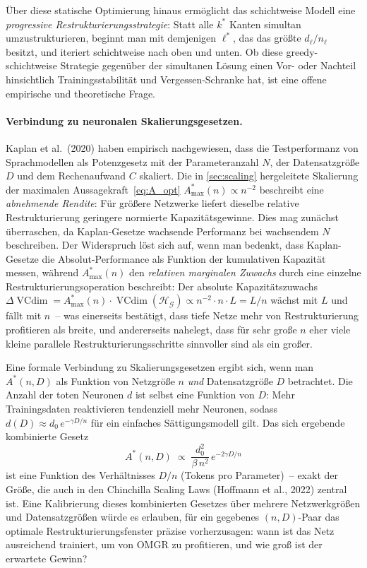 ﻿\documentclass[12pt, a4paper, openany]{report}
\newcommand{\calG}{\mathcal{G}}
\newcommand{\calH}{\mathcal{H}}
\DeclareMathOperator{\VC}{VCdim}
\begin{document}
Über diese statische Optimierung hinaus ermöglicht das schichtweise Modell
eine \emph{progressive Restrukturierungsstrategie}: Statt alle $k^*$ Kanten
simultan umzustrukturieren, beginnt man mit demjenigen $\ell^*$, das das
größte $d_{\ell} / n_{\ell}$ besitzt, und iteriert schichtweise nach oben
und unten.  Ob diese greedy-schichtweise Strategie gegenüber der simultanen
Lösung einen Vor- oder Nachteil hinsichtlich Trainings\-stabilität und
Vergessen-Schranke hat, ist eine offene empirische und theoretische Frage.

\paragraph{Verbindung zu neuronalen Skalierungsgesetzen.}
Kaplan et al.\ (2020) haben empirisch nachgewiesen, dass die Testperformanz
von Sprachmodellen als Potenzgesetz mit der Parameteranzahl $N$, der
Datensatzgröße $D$ und dem Rechenaufwand $C$ skaliert.  Die in \cref{sec:scaling}
hergeleitete Skalierung der maximalen Aussagekraft~\eqref{eq:A_opt}
$A^*_{\max}(n) \propto n^{-2}$ beschreibt eine \emph{abnehmende Rendite}:
Für größere Netzwerke liefert dieselbe relative Restrukturierung geringere
normierte Kapazitätsgewinne.  Dies mag zunächst überraschen, da Kaplan-Gesetze
wachsende Performanz bei wachsendem $N$ beschreiben.  Der Widerspruch löst
sich auf, wenn man bedenkt, dass Kaplan-Gesetze die Absolut-Performance als
Funktion der kumulativen Kapazität messen, während $A^*_{\max}(n)$ den
\emph{relativen marginalen Zuwachs} durch eine einzelne Restrukturierungsoperation
beschreibt: Der absolute Kapazitätszuwachs
$\Delta\VC = A^*_{\max}(n) \cdot \VC(\calH_{\calG}) \propto n^{-2} \cdot n \cdot L = L/n$
wächst mit $L$ und fällt mit $n$~-- was einerseits bestätigt, dass tiefe
Netze mehr von Restrukturierung profitieren als breite, und andererseits
nahelegt, dass für sehr große $n$ eher viele kleine parallele
Restrukturierungsschritte sinnvoller sind als ein großer.

Eine formale Verbindung zu Skalierungsgesetzen ergibt sich, wenn man
$A^*(n, D)$ als Funktion von Netzgröße $n$ \emph{und} Datensatzgröße $D$
betrachtet.  Die Anzahl der toten Neuronen $d$ ist selbst eine Funktion von
$D$: Mehr Trainingsdaten reaktivieren tendenziell mehr Neuronen, sodass
$d(D) \approx d_0\,e^{-\gamma D/n}$ für ein einfaches Sättigungsmodell gilt.
Das sich ergebende kombinierte Gesetz
\[
  A^*(n, D) \;\propto\; \frac{d_0^2}{\beta\,n^2}\,e^{-2\gamma D/n}
\]
ist eine Funktion des Verhältnisses $D/n$ (Tokens pro Parameter)~-- exakt
der Größe, die auch in den Chinchilla Scaling Laws (Hoffmann et al., 2022)
zentral ist.  Eine Kalibrierung dieses kombinierten Gesetzes über mehrere
Netzwerkgrößen und Datensatzgrößen würde es erlauben, für ein gegebenes
$(n, D)$-Paar das optimale Restrukturierungsfenster präzise vorherzusagen:
wann ist das Netz ausreichend trainiert, um von OMGR zu profitieren, und
wie groß ist der erwartete Gewinn?
\end{document}

